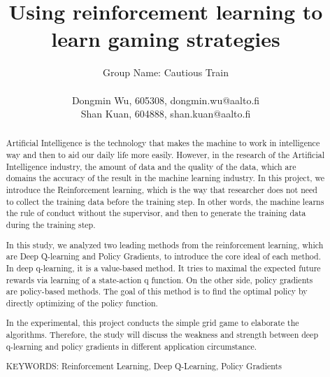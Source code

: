 \documentclass[article]{aaltoseries}
\begin{document}
 

\title{Using reinforcement learning to learn gaming strategies}

\author{Group Name: Cautious Train\\\\Dongmin Wu, 605308, dongmin.wu@aalto.fi%
\\
{Shan Kuan, 604888, shan.kuan@aalto.fi}} %

\maketitle


\begin{abstract}
Artificial Intelligence is the technology that makes the machine to work in intelligence way and then to aid our daily life more easily. However, in the research of the Artificial Intelligence industry, the amount of data and the quality of the data, which are domains the accuracy of the result in the machine learning industry. In this project, we introduce the Reinforcement learning, which is the way that researcher does not need to collect the training data before the training step. In other words, the machine learns the rule of conduct without the supervisor, and then to generate the training data during the training step.

In this study, we analyzed two leading methods from the reinforcement learning, which are Deep Q-learning and Policy Gradients, to introduce the core ideal of each method. In deep q-learning, it is a value-based method. It tries to maximal the expected future rewards via learning of a state-action q function. On the other side, policy gradients are policy-based methods. The goal of this method is to find the optimal policy by directly optimizing of the policy function.

In the experimental, this project conducts the simple grid game to elaborate the algorithms. Therefore, the study will discuss the weakness and strength between deep q-learning and policy gradients in different application circumstance. 
  

\vspace{3mm}
\noindent KEYWORDS: Reinforcement Learning, Deep Q-Learning, Policy Gradients

\end{abstract}
\end{document}
